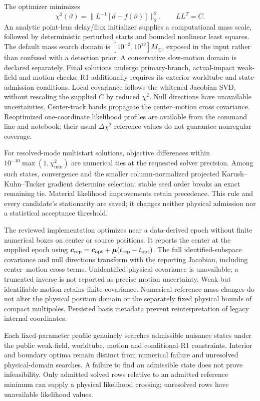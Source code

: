 The optimizer minimizes
\begin{equation}
 \chi^2(\vartheta)=\|L^{-1}[d-f(\vartheta)]\|_2^2,
 \qquad LL^T=C.
 \label{eq:product-likelihood}
\end{equation}
An analytic point-lens delay/flux initializer supplies a computational
mass scale, followed by deterministic perturbed starts and bounded
nonlinear least squares. The default mass search domain is
$[10^{-3},10^{12}]M_\odot$, exposed in the input rather than confused
with a detection prior. A conservative slow-motion domain is declared
separately. Final solutions undergo primary-branch, actual-impact
weak-field and motion checks; R1 additionally requires its exterior
worldtube and state-admission conditions. Local covariance follows the whitened Jacobian SVD,
without rescaling the supplied $C$ by reduced $\chi^2$. Null directions
have unavailable uncertainties. Center-track bands propagate the
center--motion cross covariance. Reoptimized one-coordinate likelihood
profiles are available from the command line and notebook; their usual
$\Delta\chi^2$ reference values do not guarantee nonregular coverage.

For resolved-mode multistart solutions, objective differences within
$10^{-10}\max(1,\chi^2_{\min})$ are numerical ties at the requested
solver precision. Among such states, convergence and the smaller
column-normalized projected Karush--Kuhn--Tucker gradient determine selection; stable
seed order breaks an exact remaining tie. Material likelihood improvements
retain precedence. This rule and every candidate's stationarity are saved;
it changes neither physical admission nor a statistical acceptance threshold.

The reviewed implementation optimizes near a data-derived epoch without
finite numerical boxes on center or source positions. It reports the
center at the supplied epoch using
$\boldsymbol c_{\rm rep}=\boldsymbol c_{\rm opt}+
\boldsymbol\mu(t_{\rm rep}-t_{\rm opt})$.
The full identified-subspace covariance and null directions transform
with the reporting Jacobian, including center--motion cross terms.
Unidentified physical covariance is unavailable; a truncated inverse is
not reported as precise motion uncertainty. Weak but identifiable motion
retains finite covariance. Numerical reference mass changes do not alter
the physical position domain or the separately fixed physical bounds of
compact multipoles. Persisted basis metadata prevent reinterpretation of
legacy internal coordinates.

Each fixed-parameter profile genuinely searches admissible nuisance
states under the public weak-field, worldtube, motion and conditional-R1
constraints. Interior and boundary optima remain distinct from numerical
failure and unresolved physical-domain searches. A failure to find an
admissible state does not prove infeasibility. Only admitted solved rows
relative to an admitted reference minimum can supply a physical
likelihood crossing; unresolved rows have unavailable likelihood values.

